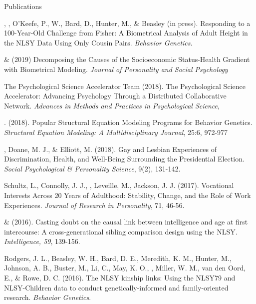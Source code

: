 \begin{rSection}{\textrm{Publications}}%
\begin{etaremune}
\item\Joe, \meb, O'Keefe, P., W., Bard, D., Hunter, M., \& Beasley (in press). Responding to a 100-Year-Old Challenge from Fisher: A Biometrical Analysis of Adult Height in the NLSY Data Using Only Cousin Pairs.  \textit{Behavior Genetics}.
\item \meb \& \joe (2019) Decomposing the Causes of the Socioeconomic Status-Health Gradient with Biometrical Modeling. \textit{Journal of Personality and Social Psychology} 
\item The Psychological Science Accelerator Team (2018). The Psychological Science Accelerator: Advancing Psychology Through a Distributed Collaborative Network. \textit{Advances in Methods and Practices in Psychological Science}, 
\item \meb. (2018). Popular Structural Equation Modeling Programs for Behavior Genetics. \textit{Structural Equation Modeling: A Multidisciplinary Journal}, 25:6, 972-977 
\item\meb, Doane, M. J., \& Elliott, M. (2018). Gay and Lesbian Experiences of Discrimination, Health, and Well-Being Surrounding the Presidential Election. \textit{Social Psychological \& Personality Science}, 9(2), 131-142. 
\item Schultz, L., Connolly, J. J., \meb, Leveille, M., Jackson, J. J. (2017). Vocational Interests Across 20 Years of Adulthood: Stability, Change, and the Role of Work Experiences. \textit{Journal of Research in Personality}, 71, 46-56.
\item\meb \& \Joe (2016). Casting doubt on the causal link between intelligence and age at first intercourse: A cross-generational sibling comparison design using the NLSY. \textit{Intelligence, 59}, 139-156. 
\item Rodgers, J. L., Beasley, W. H., Bard, D. E., Meredith, K. M., Hunter, M., Johnson, A. B., Buster, M., Li, C., May, K. O., \meb, Miller, W. M., van den Oord, E., \& Rowe, D. C. (2016). The NLSY kinship links: Using the NLSY79 and NLSY-Children data to conduct genetically-informed and family-oriented research. \textit{Behavior Genetics}. 

\end{etaremune}
\end{rSection}
